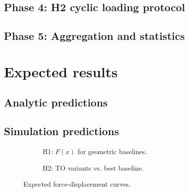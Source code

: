 \documentclass[11pt,a4paper]{article}
\theoremstyle{claim}
\begin{document}
\subsection{Phase 4: H2 cyclic loading protocol}

\subsection{Phase 5: Aggregation and statistics}

\section{Expected results}

\subsection{Analytic predictions}

\subsection{Simulation predictions}

\begin{figure}[H]
  \centering
  \begin{subfigure}[t]{0.48\linewidth}
    \caption{H1: $F(x)$ for geometric baselines.}
    \label{fig:h1fx}
  \end{subfigure}
  \hfill
  \begin{subfigure}[t]{0.48\linewidth}
    \caption{H2: TO variants vs. best baseline.}
    \label{fig:h2fx}
  \end{subfigure}
  \caption{Expected force-displacement curves.}
  \label{fig:fx}
\end{figure}
\end{document}
